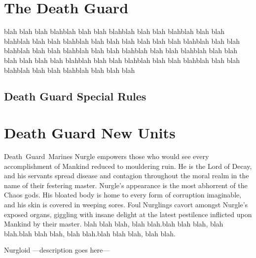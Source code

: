 \documentclass[a4paper, twocolumn]{article}
\begin{document}

\section{The Death Guard}
blah blah blah blahblah blah blah blahblah blah blah blahblah blah blah blahblah blah blah blahblah blah blah blah
blah blah blah blahblah blah blah blahblah blah blah blahblah blah blah blahblah blah blah blahblah blah blah blah
blah blah blah blahblah blah blah blahblah blah blah blahblah blah blah blahblah blah blah blahblah blah blah blah
 
\subsection{Death Guard Special Rules}

%
\clearpage \onecolumn
\section{Death Guard New Units}

\unit{Death Guard Marines}{
	Nurgle empowers those who would see every accomplishment of Mankind reduced to mouldering ruin.
	He is the Lord of Decay, and his servants spread disease and contagion throughout the moral realm in the name of their festering master.
	Nurgle’s appearance is the most abhorrent of the Chaos gods. His bloated body is home to every form of corruption imaginable, and his skin is covered in weeping sores.
	Foul Nurglings cavort amongst Nurgle’s exposed organs, giggling with insane delight at the latest pestilence inflicted upon Mankind by their master.
	blah blah blah, blah blah.blah blah blah, blah blah.blah blah blah, blah blah.blah blah blah, blah blah.
}
\statsEND

\unit{Nurgloid} {							%
	---description goes here---
}
\statsEND									%
\end{document}
